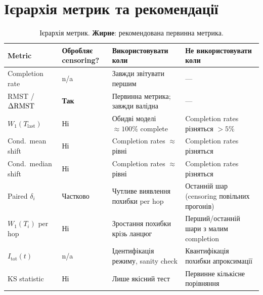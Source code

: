 \documentclass[11pt,a4paper]{article}
\begin{document}
\section{Ієрархія метрик та рекомендації}

\begin{table}[H]
\centering
\renewcommand{\arraystretch}{1.3}
\begin{tabular}{p{3.4cm}p{2.1cm}p{4.0cm}p{4.5cm}}
\toprule
\textbf{Metric} & \textbf{Обробляє censoring?} & \textbf{Використовувати коли} & \textbf{Не використовувати коли} \\
\midrule
Completion rate          & n/a        & Завжди звітувати першим             & --- \\
RMST / $\Delta\mathrm{RMST}$           & \textbf{Так} & Первинна метрика; завжди валідна    & --- \\
$W_1(T_{\mathrm{last}})$ & Ні         & Обидві моделі $\approx100\%$ complete & Completion rates різняться $>5\%$ \\
Cond.\ mean shift        & Ні         & Completion rates $\approx$ рівні    & Completion rates різняться \\
Cond.\ median shift      & Ні         & Completion rates $\approx$ рівні    & Completion rates різняться \\
Paired $\delta_i$        & Частково    & Чутливе виявлення похибки per hop   & Останній шар (censoring повільних прогонів) \\
$W_1(T_i)$ per hop       & Ні         & Зростання похибки крізь ланцюг      & Перший/останній шари з малим completion \\
$I_{\mathrm{tot}}(t)$    & n/a        & Ідентифікація режиму, sanity check & Квантифікація похибки апроксимації \\
KS statistic             & Ні         & Лише якісний тест                   & Первинне кількісне порівняння \\
\bottomrule
\end{tabular}
\caption{Ієрархія метрик.  \textbf{Жирне}: рекомендована первинна метрика.}
\label{tab:hierarchy}
\end{table}
\end{document}
